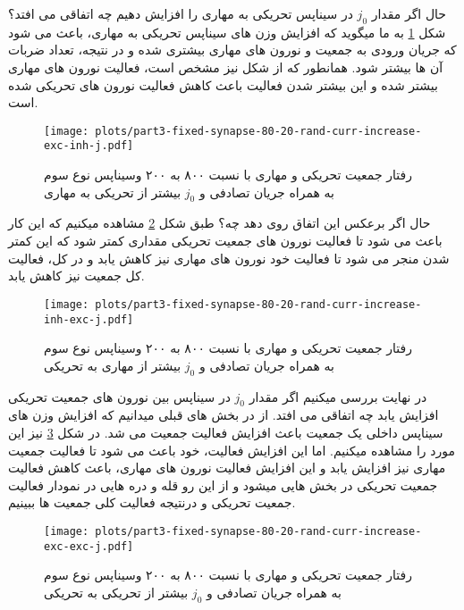                 حال اگر مقدار 
                $j_0$ 
                در سیناپس تحریکی به مهاری را افزایش دهیم چه اتفاقی می افتد؟ شکل 
                \ref{fig:part3-fixed-synapse-80-20-rand-curr-increase-exc-inh-j}
                به ما میگوید که افزایش وزن های سیناپس تحریکی به مهاری، باعث می شود که جریان ورودی به جمعیت و نورون های مهاری بیشتری شده و در نتیجه، تعداد ضربات آن ها بیشتر شود. همانطور که از شکل نیز مشخص است، فعالیت نورون های مهاری بیشتر شده و این بیشتر شدن فعالیت باعث کاهش فعالیت نورون های تحریکی شده است.
                \begin{figure}[!ht]
                    \centering
                    \texttt{[image: plots/part3-fixed-synapse-80-20-rand-curr-increase-exc-inh-j.pdf]} 
                    \caption{رفتار جمعیت تحریکی و مهاری با نسبت ۸۰۰ به ۲۰۰ وسیناپس نوع سوم به همراه جریان تصادفی و $j_0$ بیشتر از تحریکی به مهاری}
                    \label{fig:part3-fixed-synapse-80-20-rand-curr-increase-exc-inh-j}
                \end{figure}

                حال اگر برعکس این اتفاق روی دهد چه؟ طبق شکل 
                \ref{fig:part3-fixed-synapse-80-20-rand-curr-increase-inh-exc-j}
                مشاهده میکنیم که این کار باعث می شود تا فعالیت نورون های جمعیت تحریکی مقداری کمتر شود که این کمتر شدن منجر می شود تا فعالیت خود نورون های مهاری نیز کاهش یابد و در کل، فعالیت کل جمعیت نیز کاهش یابد.

                \begin{figure}[!ht]
                    \centering
                    \texttt{[image: plots/part3-fixed-synapse-80-20-rand-curr-increase-inh-exc-j.pdf]} 
                    \caption{رفتار جمعیت تحریکی و مهاری با نسبت ۸۰۰ به ۲۰۰ وسیناپس نوع سوم به همراه جریان تصادفی و $j_0$ بیشتر از مهاری به تحریکی}
                    \label{fig:part3-fixed-synapse-80-20-rand-curr-increase-inh-exc-j}
                \end{figure}

                در نهایت بررسی میکنیم اگر مقدار 
                $j_0$ 
                در سیناپس بین نورون های جمعیت تحریکی افزایش یابد چه اتفاقی می افتد. از در بخش های قبلی میدانیم که افزایش وزن های سیناپس داخلی یک جمعیت باعث افزایش فعالیت جمعیت می شد. در شکل 
                \ref{fig:part3-fixed-synapse-80-20-rand-curr-increase-exc-exc-j}
                نیز این مورد را مشاهده میکنیم. اما این افزایش فعالیت، خود باعث می شود تا فعالیت جمعیت مهاری نیز افزایش یابد و این افزایش فعالیت نورون های مهاری، باعث کاهش فعالیت جمعیت تحریکی در بخش هایی میشود و از این رو قله و دره هایی در نمودار فعالیت جمعیت تحریکی و درنتیجه فعالیت کلی جمعیت ها ببینیم.
                \begin{figure}[!ht]
                    \centering
                    \texttt{[image: plots/part3-fixed-synapse-80-20-rand-curr-increase-exc-exc-j.pdf]} 
                    \caption{رفتار جمعیت تحریکی و مهاری با نسبت ۸۰۰ به ۲۰۰ وسیناپس نوع سوم به همراه جریان تصادفی و $j_0$ بیشتر از تحریکی به تحریکی}
                    \label{fig:part3-fixed-synapse-80-20-rand-curr-increase-exc-exc-j}
                \end{figure}

